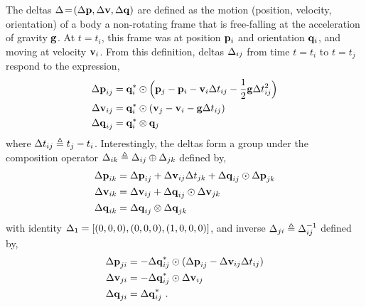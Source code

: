 The deltas $\Delta\!=\!({\Delta{\bf p}},{\Delta{\bf v}},{\Delta{\bf q}})$ are defined as the motion (position, velocity, orientation) of a body \wrt a non-rotating frame that is free-falling at the acceleration of gravity ${\bf g}$. At $t=t_i$, this frame was at position ${\bf p}_i$ and orientation ${\bf q}_i$, and moving at velocity ${\bf v}_i$. From this definition, deltas $\Delta_{ij}$ from time $t=t_i$ to $t=t_j$ respond to the expression,
%
\begin{align}
\begin{split}
{\Delta{\bf p}}_{ij} &= {\bf q}_i^*\odot\Big({\bf p}_j - {\bf p}_i - {\bf v}_i\Delta t_{ij} - \frac12{\bf g}\Delta t_{ij}^2\Big) \\
{\Delta{\bf v}}_{ij} &= {\bf q}_i^*\odot({\bf v}_j - {\bf v}_i - {\bf g}\Delta t_{ij}) \\
{\Delta{\bf q}}_{ij} &= {\bf q}_i^*\otimes{\bf q}_j 
\end{split}
\end{align}
%
where $\Delta t_{ij} \triangleq t_j - t_i$. Interestingly, the deltas form a group under the composition operator $\Delta_{ik}\triangleq\Delta_{ij}\oplus\Delta_{jk}$ defined by,
%
\begin{align} \label{equ:g_composition}
\begin{split}
{\Delta{\bf p}}_{ik} 
&= {\Delta{\bf p}}_{ij} + {\Delta{\bf v}}_{ij}\Delta t_{jk} + {\Delta{\bf q}}_{ij}\odot{\Delta{\bf p}}_{jk} \\
{\Delta{\bf v}}_{ik} 
&= {\Delta{\bf v}}_{ij} + {\Delta{\bf q}}_{ij}\odot{\Delta{\bf v}}_{jk} \\
{\Delta{\bf q}}_{ik} 
&= {\Delta{\bf q}}_{ij}\otimes{\Delta{\bf q}}_{jk} 
\end{split}
\end{align}
%
with identity $\Delta_1=[(0,0,0),(0,0,0),(1,0,0,0)]$, and inverse $\Delta_{ji}\triangleq\Delta_{ij}^{-1}$ defined by,
%
\begin{align}
\begin{split}
{\Delta{\bf p}}_{ji} 
&= -{\Delta{\bf q}}_{ij}^*\odot({\Delta{\bf p}}_{ij} - {\Delta{\bf v}}_{ij}\Delta t_{ij}) \\
{\Delta{\bf v}}_{ji} 
&= -{\Delta{\bf q}}_{ij}^*\odot{\Delta{\bf v}}_{ij} \\
{\Delta{\bf q}}_{ji} 
&= {\Delta{\bf q}}_{ij}^*
~.
\end{split}
\end{align}

%


